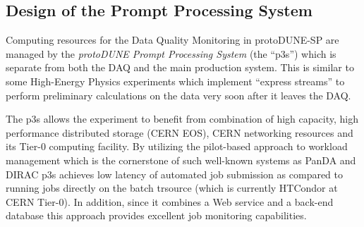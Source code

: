 \documentclass{webofc}
\newcommand{\pd}{protoDUNE\xspace}
\begin{document}
\subsection{Design of the Prompt Processing System}

Computing resources for the Data Quality Monitoring in \pd-SP are managed by
the  \textit{\pd Prompt Processing System} (the ``p3s'')
which is separate from both the DAQ and the main production system. This is similar to some High-Energy Physics
experiments which implement ``express streams'' to perform preliminary calculations on the data very soon
after it leaves the DAQ.

The  p3s allows the experiment to benefit from combination of high capacity, high
performance distributed storage (CERN EOS), CERN networking resources and its Tier-0 computing facility.
By utilizing the pilot-based approach \cite{eps} to workload management which is the cornerstone of such well-known
systems as PanDA and DIRAC \cite{panda,dirac} p3s achieves low latency of automated job submission
as compared to running jobs directly on the batch trsource (which is currently HTCondor at CERN Tier-0).
In addition, since it combines a Web service and a back-end database this approach provides excellent
job monitoring capabilities.


\end{document}
